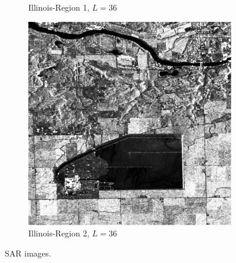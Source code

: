 \documentclass[aspectratio=1610,10pt]{beamer}
\begin{document}
\begin{frame}
\begin{figure}[H]
\begin{subfigure}[b]{0.3\textwidth}
    \caption{Illinois-Region 1, $L=36$}
    \label{fig:real_SAR_Images_coe-2}
  \end{subfigure}
  \hfill
  \begin{subfigure}[b]{0.3\textwidth}
    \centering
    \includegraphics[width=\textwidth]{../../Figures/PNG/Illinois_1024_36L}
     \caption{Illinois-Region 2,  $L=36$}
    \label{fig:real_SAR_Images_coe-3}
  \end{subfigure}
  \caption{SAR images. }
  \label{fig:real_SAR_Images_coe}
\end{figure}
\end{frame} 
\end{document}
